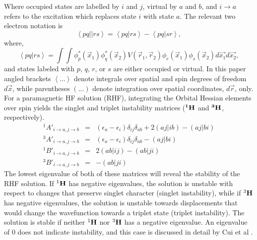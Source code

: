 \documentclass[preprint, journal=prl]{revtex4-1}
\begin{document}
  Where occupied states are labelled by $i$ and $j$, virtual by $a$ and $b$, and $i \rightarrow a$ refers to the excitation which replaces state $i$ with state $a$. The relevant two electron notation is
  \begin{equation}
    \left< pq||rs \right> = \left< pq|rs \right> - \left< pq|sr \right>,
  \end{equation}
  where, 
  \begin{equation}
    \left< pq|rs \right> = 
    \int \int \phi^*_p(\vec{x}_1) \phi^*_q(\vec{x}_2) 
    V(\vec{r}_1, \vec{r}_2) 
    \phi_r(\vec{x}_1) \phi_s(\vec{x}_2) 
    d\vec{x_1} d\vec{x_2}, 
  \end{equation}
  and states labeled with $p$, $q$, $r$, or $s$ are either occupied or virtual. In this paper angled brackets $\left< ... \right>$ denote integrals over spatial and spin degrees of freedom $d\vec{x}$, while parentheses $\left ( ... \right ) $ denote integration over spatial coordinates, $d\vec{r}$, only. For a paramagnetic HF solution (RHF), integrating the Orbital Hessian elements over spin yields the singlet and triplet instability matrices ($\bf{{}^1H}$ and $\bf{{}^3H}$, respectively)\cite{Dunning1967,Seeger1977}.
  \begin{subequations}
    \begin{eqnarray}
      {}^{1}{A'}_{i\rightarrow a, j\rightarrow b} &=& 
      (\epsilon_a-\epsilon_i)\delta_{ij}\delta_{ab} 
      + 2\left(aj|ib\right)-\left(aj|bi\right)\\
      {}^{3}{A'}_{i\rightarrow a, j\rightarrow b} &=& 
      (\epsilon_a-\epsilon_i)\delta_{ij}\delta_{ab} 
      - \left(aj|bi\right)\\
      {}^{1}{B'}_{i\rightarrow a, j\rightarrow b} &=& 2\left(ab|ij\right) - \left(ab|ji\right)\\
      {}^{3}{B'}_{i\rightarrow a, j\rightarrow b} &=& -\left(ab|ji\right)
    \end{eqnarray}
  \end{subequations}
  The lowest eigenvalue of both of these matrices will reveal the stability of the RHF solution. If  ${}^1\bf{H}$ has negative eigenvalues, the solution is unstable with respect to changes that preserve singlet character (singlet instability), while if ${}^3\bf{H}$ has negative eigenvalues, the solution is unstable towards displacements that would change the wavefunction towards a triplet state (triplet instability). The solution is stable if neither ${}^1\bf{H}$ nor ${}^3\bf{H}$ has a negative eigenvalue. An eigenvalue of 0 does not indicate instability, and this case is discussed in detail by Cui et al \cite{Cui2013}.   
    	
\end{document}
